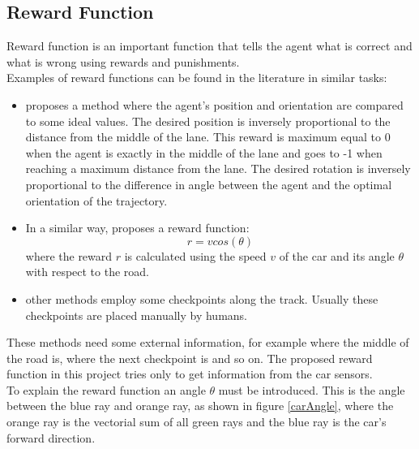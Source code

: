 \documentclass[14pt]{extarticle}
\def\sp{\vspace{5pt}}
\def\pp{\vspace{10pt}\newline}
\begin{document}
\begin{flushleft}
	\subsection{Reward Function} \label{rewardfuc}
	\sp
	Reward function is an important function that tells the agent what is correct and what is wrong using rewards and punishments. \\
	Examples of reward functions can be found in the literature in similar tasks:
	\begin{itemize}
	\item \cite{Paper1} proposes a method where the agent's position and orientation are compared to some ideal values. The desired position is inversely proportional to the distance from the middle of the lane. This reward is maximum equal to 0 when the agent is exactly in the middle of the lane and goes to -1 when reaching a maximum distance from the lane. The desired rotation is inversely proportional to the difference in angle between the agent and the optimal orientation of the trajectory.
	\item In a similar way, \cite{Paper2} proposes a reward function:
	\[
	 r = v cos(\theta)
	\]
	where the reward $r$ is calculated using the speed $v$ of the car and its angle $\theta$ with respect to the road.
	\item other methods employ some checkpoints along the track. Usually these checkpoints are placed manually by humans.
	\end{itemize}
	These methods need some external information, for example where the middle of the road is, where the next checkpoint is and so on.
	\pp 
	The proposed reward function in this project tries only to get information from the car sensors. \\
To explain the reward function an angle $\theta$ must be introduced. This is the angle between the blue ray and orange ray, as shown in figure \ref{carAngle}, where the orange ray is the vectorial sum of all green rays and the blue ray is the car's forward direction.


\end{flushleft}
\end{document}
